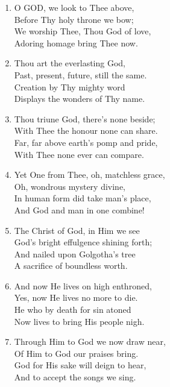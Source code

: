 \documentclass[11pt,a4paper]{article}
\begin{document}
\begin{enumerate}
    \item O GOD, we look to Thee above, \\
        Before Thy holy throne we bow; \\
        We worship Thee, Thou God of love, \\
        Adoring homage bring Thee now.

    \item Thou art the everlasting God, \\
        Past, present, future, still the same. \\
        Creation by Thy mighty word \\
        Displays the wonders of Thy name.

    \item Thou triune God, there's none beside; \\
        With Thee the honour none can share. \\
        Far, far above earth's pomp and pride, \\
        With Thee none ever can compare.

    \item Yet One from Thee, oh, matchless grace, \\
        Oh, wondrous mystery divine, \\
        In human form did take man's place, \\
        And God and man in one combine!

    \item The Christ of God, in Him we see \\
        God's bright effulgence shining forth; \\
        And nailed upon Golgotha's tree \\
        A sacrifice of boundless worth.

    \item And now He lives on high enthroned, \\
        Yes, now He lives no more to die. \\
        He who by death for sin atoned \\
        Now lives to bring His people nigh.

    \item Through Him to God we now draw near, \\
        Of Him to God our praises bring. \\
        God for His sake will deign to hear, \\
        And to accept the songs we sing.

\end{enumerate}
\end{document}
